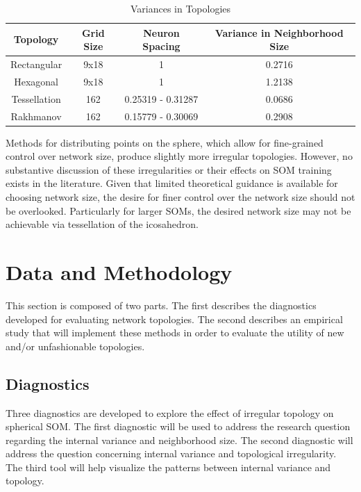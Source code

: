 \documentclass[10pt,titlepage]{article}
\begin{document}
\begin{table}[htbp]
\caption{Variances in Topologies}
\begin{center}
\begin{tabular}{|c|c|c|c|}
\hline
Topology&Grid Size&Neuron Spacing&Variance in Neighborhood Size\\
\hline
Rectangular&9x18&1&0.2716\\
Hexagonal&9x18&1&1.2138\\
Tessellation&162&0.25319 - 0.31287& 0.0686\\
Rakhmanov&162&0.15779 - 0.30069& 0.2908\\
\hline
\end{tabular}
\end{center}
\label{table1}
\end{table}

Methods for distributing points on the sphere, which allow for fine-grained
control over network size, produce slightly more irregular topologies.  However,
no substantive discussion of these irregularities or their effects on SOM
training exists in the literature. Given that limited theoretical guidance is available
for choosing network size, the desire for finer control over the network size
should not be overlooked. Particularly for larger SOMs, the desired network size
may not be achievable via tessellation of the icosahedron.

\section{Data and Methodology}
This section is composed of two parts.  The first describes the diagnostics
developed for evaluating network topologies.  The second describes an
empirical study that will implement these methods in order to evaluate the
utility of new and/or unfashionable topologies.

\subsection{Diagnostics}
Three diagnostics are developed to explore the effect of irregular topology on
spherical SOM.  The first diagnostic will be used to address the research
question regarding the internal variance and neighborhood size.  The second
diagnostic will address the question concerning internal variance and
topological irregularity.  The third tool will help visualize the patterns
between internal variance and topology.
\end{document}
